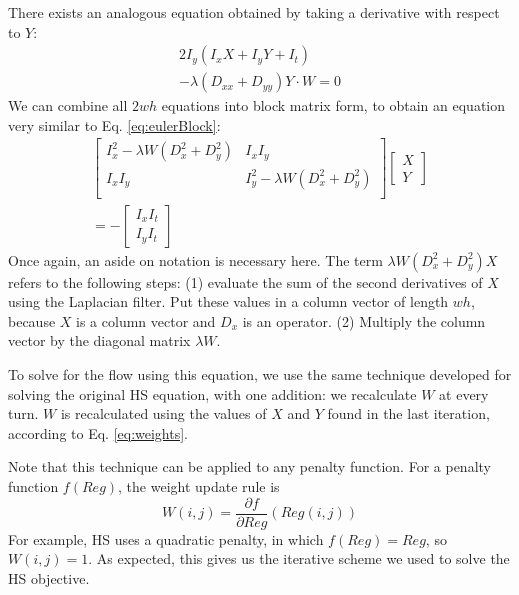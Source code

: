 \documentclass[10pt,twocolumn,letterpaper]{article}
\begin{document}
There exists an analogous equation obtained by taking a derivative with respect to $Y$:
\begin{equation} \label{eq:leastsqy}
\begin{aligned}
2I_y (I_x X + I_y Y + I_t) \\
 -\lambda(D_{xx} + D_{yy}) Y \cdot W = 0
\end{aligned}
\end{equation} 
We can combine all $2wh$ equations into block matrix form, to obtain an equation very similar to Eq. \ref{eq:eulerBlock}:
\begin{multline} \label{eq:leastsqBlock}
\left[ \begin{array}{cc}
I_x^2 - \lambda W (D_x^2 + D_y^2) & I_x I_y\\
I_x I_y & I_y^2 - \lambda W (D_x^2 + D_y^2) \\
\end{array} \right]
\left[\begin{array}{c}
X \\
Y
\end{array} \right] \\
=-\left[ \begin{array}{c}
I_x I_t \\
I_y I_t
\end{array} \right]
\end{multline}
Once again, an aside on notation is necessary here.  The term $\lambda W (D_x^2 + D_y^2) X$ refers to the following steps: (1) evaluate the sum of the second derivatives of $X$ using the Laplacian filter.  Put these values in a column vector of length $wh$, because $X$ is a column vector and $D_x$ is an operator.  (2) Multiply the column vector by the diagonal matrix $\lambda W$.

To solve for the flow using this equation, we use the same technique developed for solving the original HS equation, with one addition: we recalculate $W$ at every turn.  $W$ is recalculated using the values of $X$ and $Y$ found in the last iteration, according to Eq. \ref{eq:weights}.

Note that this technique can be applied to any penalty function.  For a penalty function $f(Reg)$, the weight update rule is 
\begin{equation} \label{eq:genericpenalty}
W(i, j) = \frac{\partial f}{\partial Reg} (Reg(i, j))
\end{equation}
For example, HS uses a quadratic penalty, in which $f(Reg) = Reg$, so $W(i, j) = 1$.  As expected, this gives us the iterative scheme we used to solve the HS objective.
\end{document}
